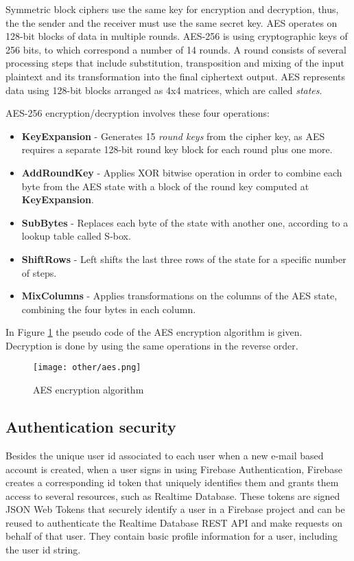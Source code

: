 \documentclass[12pt]{report}
\begin{document}
Symmetric block ciphers use the same key for encryption and decryption, thus, the the sender and the receiver must use the same secret key. AES operates on 128-bit blocks of data in multiple rounds. AES-256 is using cryptographic keys of 256 bits, to which correspond a number of 14 rounds.  A round consists of several processing steps that include substitution, transposition and mixing of the input plaintext and its transformation into the final ciphertext output. AES represents data using 128-bit blocks arranged as 4x4 matrices, which are called \textit{states}.

AES-256 encryption/decryption involves these four operations:
\begin{itemize}
\item \textbf{KeyExpansion} - Generates 15 \textit{round keys} from the cipher key, as AES requires a separate 128-bit round key block for each round plus one more. 
\item \textbf{AddRoundKey} - Applies XOR bitwise operation in order to combine each byte from the AES state with a block of the round key computed at \textbf{KeyExpansion}.
\item \textbf{SubBytes} - Replaces each byte of the state with another one, according to a lookup table called S-box.
\item \textbf{ShiftRows} - Left shifts the last three rows of the state for a specific number of steps.
\item \textbf{MixColumns} - Applies transformations on the columns of the AES state, combining the four bytes in each column.
\end{itemize}

In Figure \ref{fig:aes} the pseudo code of the AES encryption algorithm is given. Decryption is done by using the same operations in the reverse order.

\begin{figure}[H]
\centerline{\texttt{[image: other/aes.png]}}
    \caption{AES encryption algorithm \cite{aespaper}}
    \label{fig:aes}
\end{figure}


\subsection{Authentication security}

Besides the unique user id associated to each user when a new e-mail based account is created, when a user signs in using Firebase Authentication, Firebase creates a corresponding id token that uniquely identifies them and grants them access to several resources, such as Realtime Database. These tokens are signed JSON Web Tokens that securely identify a user in a Firebase project and can be reused to authenticate the Realtime Database REST API and make requests on behalf of that user. They contain basic profile information for a user, including the user id string. 
\end{document}

